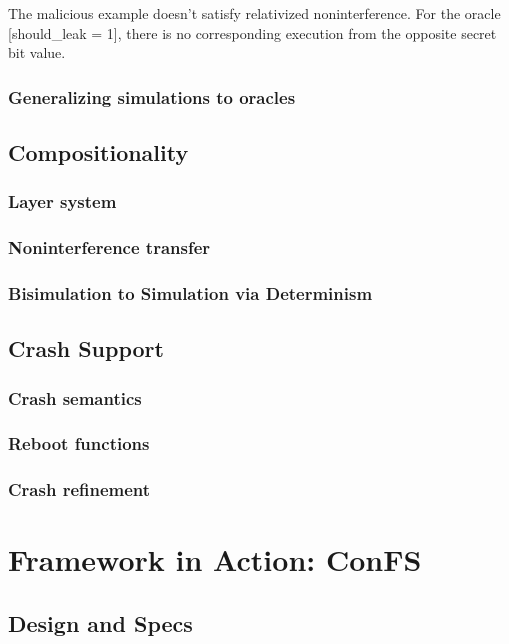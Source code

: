 \documentclass[onecolumn]{paper}
\begin{document}
			The malicious example doesn’t satisfy relativized noninterference. For the oracle [should\_leak = 1], there is no corresponding execution from the opposite secret bit value.
		\subsubsection{Generalizing simulations to oracles}

	\subsection{Compositionality}
		\subsubsection{Layer system}
		\subsubsection{Noninterference transfer}
		\subsubsection{Bisimulation to Simulation via Determinism}

	\subsection{Crash Support}
		\subsubsection{Crash semantics} 
		\subsubsection{Reboot functions}
		\subsubsection{Crash refinement}
\newpage
\section{Framework in Action: ConFS}
	\subsection{Design and Specs}
\end{document}
